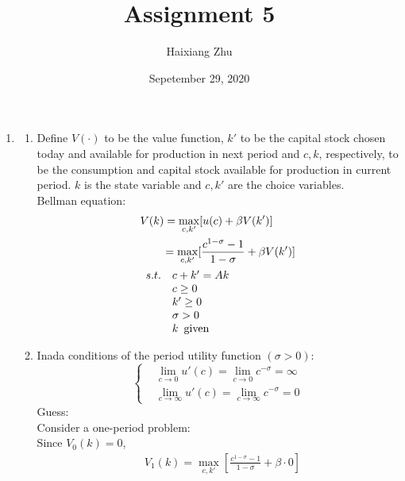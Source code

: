 \documentclass{article}
\title{Assignment 5}
\date{Sepetember 29, 2020}
\author{Haixiang Zhu}
\begin{document}
    \maketitle
    \renewcommand{\arraystretch}{1.2}
    \begin{enumerate}
        \item 
        \begin{enumerate}
            \item Define $V(\cdot)$ to be the value function, $k'$ to be the capital stock chosen today and available for production in next period and $c,k$, respectively, to be the consumption and capital stock available for production in current period.
            $k$ is the state variable and $c,k'$ are the choice variables.\\
            Bellman equation: 
            \begin{align*}
                &V(k)=\max_{c,k'}[u(c)+\beta V(k')]\\
                &\qquad=\max_{c,k'}[\frac{c^{1-\sigma}-1}{1-\sigma}+\beta V(k')]\\
                &\begin{array}{r@{\quad}l}
                    s.t.&c+k'=Ak\\
                    &c\ge0\\
                    &k'\ge0\\
                    &\sigma>0\\
                    &k\enspace\text{given}    
                \end{array}           
            \end{align*}
            \item Inada conditions of the period utility function $(\sigma>0)$:
            \begin{equation*}
                \left\{
                \begin{aligned}
                &\lim_{c\to0}{u}'(c)=\lim_{c\to0}c^{-\sigma}=\infty\\
                &\lim_{c\to\infty}{u}'(c)=\lim_{c\to\infty}c^{-\sigma}=0
                \end{aligned}
            \right.
            \end{equation*}
            Guess:\\
            Consider a one-period problem:\\
            Since $V_0(k)=0$,
            \begin{align*}
                &V_1(k)=\max_{c,k'}[\frac{c^{1-\sigma}-1}{1-\sigma}+\beta\cdot0]\\

\end{align*}
\end{enumerate}
\end{enumerate}
\end{document}
